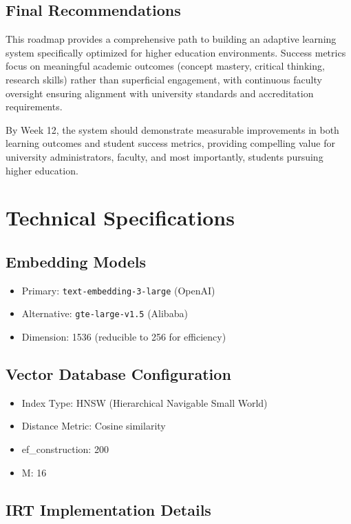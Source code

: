 \documentclass[11pt,a4paper]{report}
\begin{document}
\section{Final Recommendations}

This roadmap provides a comprehensive path to building an adaptive learning system specifically optimized for higher education environments. Success metrics focus on meaningful academic outcomes (concept mastery, critical thinking, research skills) rather than superficial engagement, with continuous faculty oversight ensuring alignment with university standards and accreditation requirements.

By Week 12, the system should demonstrate measurable improvements in both learning outcomes and student success metrics, providing compelling value for university administrators, faculty, and most importantly, students pursuing higher education.

\appendix
\chapter{Technical Specifications}

\section{Embedding Models}
\begin{itemize}
    \item Primary: \texttt{text-embedding-3-large} (OpenAI)
    \item Alternative: \texttt{gte-large-v1.5} (Alibaba)
    \item Dimension: 1536 (reducible to 256 for efficiency)
\end{itemize}

\section{Vector Database Configuration}
\begin{itemize}
    \item Index Type: HNSW (Hierarchical Navigable Small World)
    \item Distance Metric: Cosine similarity
    \item ef\_construction: 200
    \item M: 16
\end{itemize}

\section{IRT Implementation Details}
\end{document}
